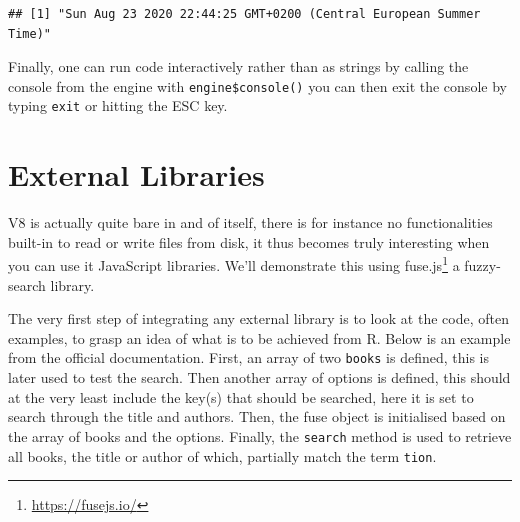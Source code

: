 \documentclass[
]{krantz}
\makeatletter
\newenvironment{Shaded}{\begin{snugshade}}{\end{snugshade}}
\newcommand{\CommentTok}[1]{\textcolor[rgb]{0.37,0.37,0.37}{\textit{#1}}}
\newcommand{\KeywordTok}[1]{\textcolor[rgb]{0.27,0.27,0.27}{\textbf{#1}}}
\newcommand{\NormalTok}[1]{#1}
\newcommand{\OperatorTok}[1]{\textcolor[rgb]{0.43,0.43,0.43}{\textbf{#1}}}
\newcommand{\StringTok}[1]{\textcolor[rgb]{0.5,0.5,0.5}{#1}}
\renewcommand{\href}[2]{#2\footnote{\url{#1}}}
\newenvironment{kframe}{%
\medskip{}
\setlength{\fboxsep}{.8em}
 \def\at@end@of@kframe{}%
 \ifinner\ifhmode%
  \def\at@end@of@kframe{\end{minipage}}%
  \begin{minipage}{\columnwidth}%
 \fi\fi%
 \def\FrameCommand##1{\hskip\@totalleftmargin \hskip-\fboxsep
 \colorbox{shadecolor}{##1}\hskip-\fboxsep
     \hskip-\linewidth \hskip-\@totalleftmargin \hskip\columnwidth}%
 \MakeFramed {\advance\hsize-\width
   \@totalleftmargin\z@ \linewidth\hsize
   \@setminipage}}%
 {\par\unskip\endMakeFramed%
 \at@end@of@kframe}
\renewenvironment{Shaded}{\begin{kframe}}{\end{kframe}}
\makeatother
\begin{document}
\begin{Shaded}
\end{Shaded}

\begin{verbatim}
## [1] "Sun Aug 23 2020 22:44:25 GMT+0200 (Central European Summer Time)"
\end{verbatim}

Finally, one can run code interactively rather than as strings by calling the console from the engine with \texttt{engine\$console()} you can then exit the console by typing \texttt{exit} or hitting the ESC key.

\hypertarget{external-libraries}{%
\section{External Libraries}\label{external-libraries}}

V8 is actually quite bare in and of itself, there is for instance no functionalities built-in to read or write files from disk, it thus becomes truly interesting when you can use it JavaScript libraries. We'll demonstrate this using \href{https://fusejs.io/}{fuse.js} a fuzzy-search library.

The very first step of integrating any external library is to look at the code, often examples, to grasp an idea of what is to be achieved from R. Below is an example from the official documentation. First, an array of two \texttt{books} is defined, this is later used to test the search. Then another array of options is defined, this should at the very least include the key(s) that should be searched, here it is set to search through the title and authors. Then, the fuse object is initialised based on the array of books and the options. Finally, the \texttt{search} method is used to retrieve all books, the title or author of which, partially match the term \texttt{tion}.
\end{document}
